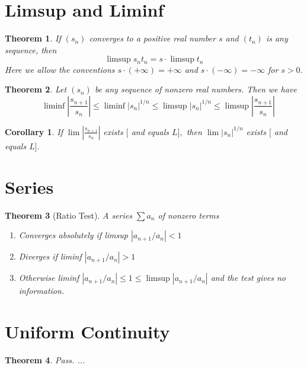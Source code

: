 \documentclass[12pt]{article}
\newtheorem{theorem}{Theorem}[section]
\newtheorem{corollary}{Corollary}[theorem]
\begin{document}
\section{Limsup and Liminf}
\begin{theorem}
	If $\left( s _ { n } \right)$ converges to a positive real number $s$ and $\left( t _ { n } \right)$ is any sequence,
	then $$
	\limsup s _ { n } t _ { n } = s \cdot \limsup t _ { n }
	$$ Here we allow the conventions $s \cdot ( + \infty ) = + \infty$ and $s \cdot ( - \infty ) = - \infty$
	for $s > 0 .$
\end{theorem}
\begin{theorem}
	Let $\left( s _ { n } \right)$ be any sequence of nonzero real numbers. Then we have
	$$\quad \liminf \left| \frac { s _ { n + 1 } } { s _ { n } } \right| \leq \liminf \left| s _ { n } \right| ^ { 1 / n } \leq \limsup \left| s _ { n } \right| ^ { 1 / n } \leq \limsup \left| \frac { s _ { n + 1 } } { s _ { n } } \right|$$
\end{theorem}
\begin{corollary}
	If $\lim \left| \frac { s _ { n + 1 } } { s _ { n } } \right|$ exists $[$ and equals $L ] ,$ then $\lim \left| s _ { n } \right| ^ { 1 / n } $ exists $[$ and
	equals $L ] .$
\end{corollary}
\section{Series}
\begin{theorem}[Ratio Test]
A series $\sum a_{n}$ of nonzero terms
\begin{enumerate}
	\item Converges absolutely if limsup $\left| a _ { n + 1 } / a _ { n } \right| < 1$
	\item Diverges if liminf $\left| a _ { n + 1 } / a _ { n } \right| > 1$
	\item Otherwise liminf $\left| a _ { n + 1 } / a _ { n } \right| \leq 1 \leq \limsup \left| a _ { n + 1 } / a _ { n } \right|$ and the test gives no information.
\end{enumerate}
\end{theorem}


\section{Uniform Continuity}
\begin{theorem}
	Pass. ...
\end{theorem}
\end{document}
